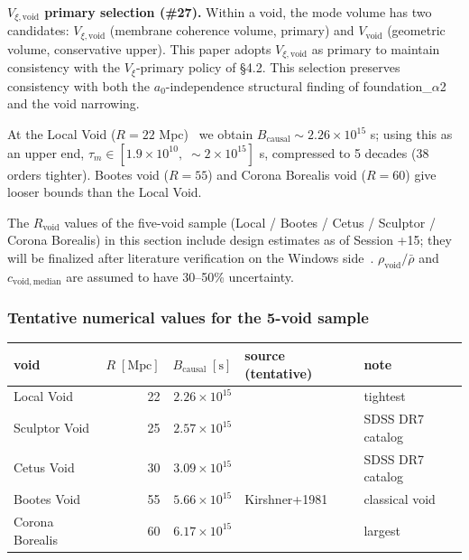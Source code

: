 \documentclass[11pt,a4paper]{article}
\newcommand{\Vxi}{V_{\xi}}
\newcommand{\Vxivoid}{V_{\xi,\mathrm{void}}}
\newcommand{\taum}{\tau_{m}}
\newcommand{\Rvoid}{R_{\mathrm{void}}}
\begin{document}
\begin{notebox}
\textbf{$\Vxivoid$ primary selection (\#27).}
Within a void, the mode volume has two candidates: $\Vxivoid$ (membrane coherence volume, primary)
and $V_{\mathrm{void}}$ (geometric volume, conservative upper). This paper adopts $\Vxivoid$ as
primary to maintain consistency with the $\Vxi$-primary policy of \S 4.2. This selection preserves
consistency with both the $a_0$-independence structural finding of foundation\_$\alpha$2 and the
void narrowing.
\end{notebox}

At the Local Void ($R = 22$ Mpc)~\citep{Kreckel2011} we obtain
$B_{\mathrm{causal}} \sim 2.26 \times 10^{15}$ s; using this as an upper end,
$\taum \in [1.9 \times 10^{10},\; \sim 2 \times 10^{15}]$ s, compressed to 5 decades (38 orders
tighter). Bootes void ($R = 55$) and Corona Borealis void ($R = 60$) give looser bounds than the
Local Void.

\begin{warnbox}
The $\Rvoid$ values of the five-void sample (Local / Bootes / Cetus / Sculptor / Corona Borealis)
in this section include design estimates as of Session +15; they will be finalized after literature
verification on the Windows side~\citep{Kreckel2011, Pan2012, Ricciardelli2014}.
$\rho_{\mathrm{void}}/\bar{\rho}$ and $c_{\mathrm{void,median}}$ are assumed to have 30--50\%
uncertainty.
\end{warnbox}

\subsubsection{Tentative numerical values for the 5-void sample}
\begin{center}\small
\begin{tabular}{@{}lrrll@{}}
\toprule
void & $R\;[\mathrm{Mpc}]$ & $B_{\mathrm{causal}}\;[\mathrm{s}]$ & source (tentative) & note \\
\midrule
Local Void & 22 & $2.26 \times 10^{15}$ & \citet{Kreckel2011} & tightest \\
Sculptor Void & 25 & $2.57 \times 10^{15}$ & \citet{Pan2012} & SDSS DR7 catalog \\
Cetus Void & 30 & $3.09 \times 10^{15}$ & \citet{Pan2012} & SDSS DR7 catalog \\
Bootes Void & 55 & $5.66 \times 10^{15}$ & Kirshner+1981 & classical void \\
Corona Borealis & 60 & $6.17 \times 10^{15}$ & \citet{Ricciardelli2014} & largest \\
\bottomrule
\end{tabular}
\end{center}
\end{document}

